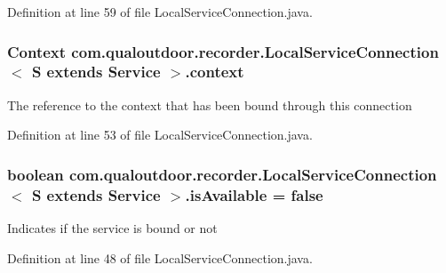 Definition at line 59 of file Local\-Service\-Connection.\-java.

\hypertarget{classcom_1_1qualoutdoor_1_1recorder_1_1LocalServiceConnection_3_01S_01extends_01Service_01_4_a04ac41815a3e3e0bf43f73a207326685}{
\subsubsection[{context}]{\setlength{\rightskip}{0pt plus 5cm}Context com.\-qualoutdoor.\-recorder.\-Local\-Service\-Connection$<$ S extends Service $>$.context\hspace{0.3cm}{\ttfamily [private]}}}\label{classcom_1_1qualoutdoor_1_1recorder_1_1LocalServiceConnection_3_01S_01extends_01Service_01_4_a04ac41815a3e3e0bf43f73a207326685}
The reference to the context that has been bound through this connection 

Definition at line 53 of file Local\-Service\-Connection.\-java.

\hypertarget{classcom_1_1qualoutdoor_1_1recorder_1_1LocalServiceConnection_3_01S_01extends_01Service_01_4_add998e9cac132822c3c72265d85aacc8}{
\subsubsection[{is\-Available}]{\setlength{\rightskip}{0pt plus 5cm}boolean com.\-qualoutdoor.\-recorder.\-Local\-Service\-Connection$<$ S extends Service $>$.is\-Available = false\hspace{0.3cm}{\ttfamily [private]}}}\label{classcom_1_1qualoutdoor_1_1recorder_1_1LocalServiceConnection_3_01S_01extends_01Service_01_4_add998e9cac132822c3c72265d85aacc8}
Indicates if the service is bound or not 

Definition at line 48 of file Local\-Service\-Connection.\-java.

